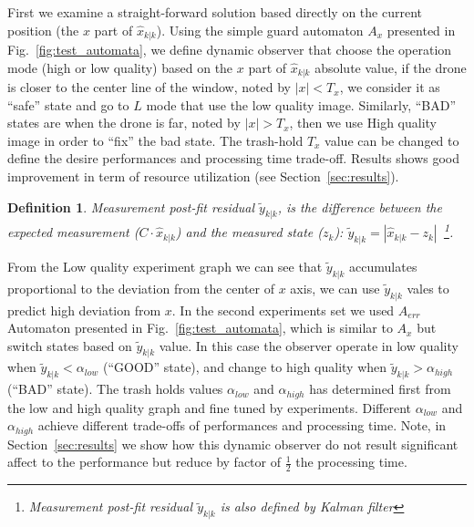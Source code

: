 \documentclass{sig-alternate-ipsn13}
\newtheorem{dfn}[thm]{Definition}
\begin{document}
First we examine a straight-forward solution based directly on the current position (the $x$ part of $\hat{x}_{k|k}$). Using the simple guard automaton $A_{x}$ presented in Fig.~\ref{fig:test_automata}, we define dynamic observer that choose the operation mode (high or low quality) based on the $x$ part of $\hat{x}_{k|k}$ absolute value, if the drone is closer to the center line of the window, noted by $|x| < T_x$, we consider it as ``safe'' state and go to $L$ mode that use the low quality image.
Similarly, ``BAD'' states are when the drone is far, noted by $|x| > T_x$, then we use High quality image in order to ``fix'' the bad state.
The trash-hold $T_x$ value can be changed to define the desire performances and processing time trade-off.
Results shows good improvement in term of resource utilization (see Section~\ref{sec:results}). 

\begin{dfn}
\textit{Measurement post-fit residual} $\tilde{y}_{k|k}$, is the difference between the expected measurement ($C \cdot \hat{x}_{k|k}$) and the measured state ($z_k$): $\tilde{y}_{k|k} = |  \hat{x}_{k|k} - z_k |$~\footnote{ Measurement post-fit residual $\tilde{y}_{k|k}$ is also defined by Kalman filter}.
\end{dfn}
From the Low quality experiment graph we can see that $\tilde{y}_{k|k}$ accumulates proportional to the deviation from the center of $x$ axis, we can use $\tilde{y}_{k|k}$ vales to predict high deviation from $x$.
In the second experiments set we used $A_{err}$ Automaton presented in Fig.~\ref{fig:test_automata}, which is similar to $A_x$ but switch states based on $\tilde{y}_{k|k}$ value.
In this case the observer operate in low quality when $\tilde{y}_{k|k} < \alpha_{low}$ (``GOOD'' state), and change to high quality when $\tilde{y}_{k|k} > \alpha_{high}$ (``BAD'' state).
The trash holds values $ \alpha_{low}$ and $ \alpha_{high}$ has determined first from the low and high quality graph and fine tuned by experiments. 
Different $ \alpha_{low}$ and $ \alpha_{high}$ achieve different trade-offs of performances and processing time.
Note, in Section~\ref{sec:results} we show how this dynamic observer do not result significant affect to the performance but reduce by factor of $\frac{1}{2}$ the processing time.
\end{document}
